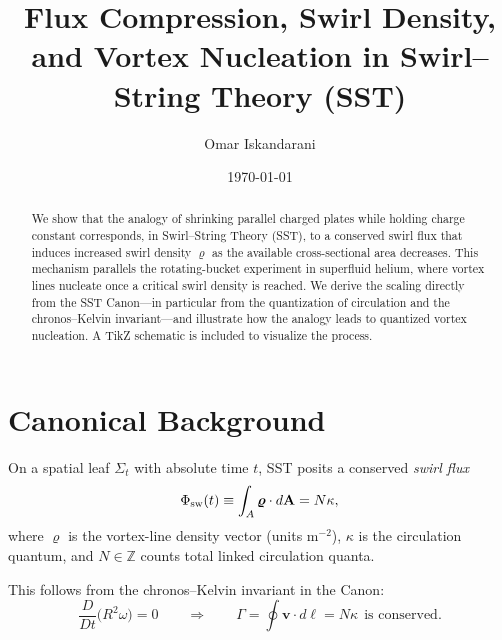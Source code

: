 \documentclass[11pt,a4paper]{article}
\title{Flux Compression, Swirl Density, and Vortex Nucleation in Swirl--String Theory (SST)}
\author{Omar Iskandarani}
\date{\today}
\begin{document}
\maketitle

\begin{abstract}
We show that the analogy of shrinking parallel charged plates while holding charge constant corresponds, in Swirl--String Theory (SST), to a conserved swirl flux that induces increased swirl density $\bm{\varrho}$ as the available cross-sectional area decreases. This mechanism parallels the rotating-bucket experiment in superfluid helium, where vortex lines nucleate once a critical swirl density is reached. We derive the scaling directly from the SST Canon---in particular from the quantization of circulation and the chronos--Kelvin invariant---and illustrate how the analogy leads to quantized vortex nucleation. A TikZ schematic is included to visualize the process.
\end{abstract}

\section{Canonical Background}
    On a spatial leaf $\Sigma_t$ with absolute time $t$, SST posits a conserved \emph{swirl flux}
    \begin{equation}
    \Phi_{\rm sw}(t) \equiv \int_A \bm{\varrho}\cdot d\mathbf A = N\kappa,
    \end{equation}
    where $\bm{\varrho}$ is the vortex-line density vector (units m$^{-2}$), $\kappa$ is the circulation quantum, and $N\in\mathbb{Z}$ counts total linked circulation quanta.

    This follows from the chronos--Kelvin invariant in the Canon:
    \begin{equation}
    \frac{D}{Dt} \Big( R^2 \omega \Big) = 0 \qquad \Rightarrow \qquad \Gamma = \oint \mathbf v \cdot d\boldsymbol\ell = N\kappa \ \ \text{is conserved}.
    \end{equation}
\end{document}
